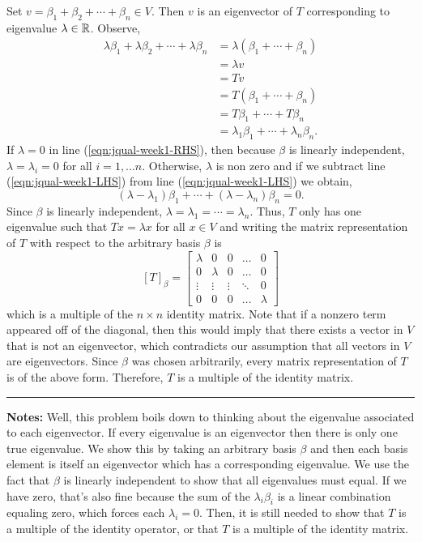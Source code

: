 \documentclass{article}
\begin{document}
Set $v = \beta_1 + \beta_2 + \cdots + \beta_n\in V$. Then $v$ is an eigenvector of $T$ corresponding to
 eigenvalue $\lambda\in\mathbb R$. Observe,
 	\begin{align}
		\lambda \beta_1 + \lambda \beta_2 + \cdots + \lambda \beta_n 
			& = \lambda(\beta_1+\cdots+\beta_n) \label{eqn:jqual-week1-RHS}\\
			& = \lambda v \nonumber \\
			& = Tv \nonumber \\
			& = T(\beta_1+\cdots+\beta_n) \nonumber \\
			& = T\beta_1 + \cdots + T\beta_n \nonumber \\
			& =  \lambda_1 \beta_1 + \cdots + \lambda_n \beta_n .\label{eqn:jqual-week1-LHS}
	\end{align}
If $\lambda = 0$ in line (\ref{eqn:jqual-week1-RHS}), then because $\beta$ is linearly independent, 
$\lambda = \lambda_i = 0$ for all $i = 1,\dots n$. Otherwise, $\lambda$ is non zero and if we subtract
 line  (\ref{eqn:jqual-week1-LHS}) from line (\ref{eqn:jqual-week1-LHS}) we obtain,
 	\[ (\lambda - \lambda_1) \beta_1 + \cdots + (\lambda - \lambda_n) \beta_n = 0.\]
Since $\beta$ is linearly independent, $\lambda = \lambda_1=\cdots = \lambda_n$. Thus, $T$ only has one eigenvalue such that $Tx = \lambda x$ for all $x\in V$ and writing the matrix representation of $T$ with respect to the arbitrary basis $\beta$ is 
	\[ [T]_\beta = \begin{bmatrix} 
				\lambda & 0 & 0 & \dots & 0\\
				0 & \lambda & 0 & \dots & 0\\
				\vdots & \vdots & \vdots & \ddots & 0\\
				0 & 0 & 0 & \dots & \lambda 
				\end{bmatrix}\]
which is a multiple of the $n\times n$ identity matrix. Note that if a nonzero term appeared off of the diagonal, then this would imply that there exists a vector in $V$ that is not an eigenvector, which contradicts our assumption that all vectors in $V$ are eigenvectors. Since $\beta$ was chosen arbitrarily, every matrix representation of $T$ is of the above form. Therefore, $T$ is a multiple of the identity matrix. \\

\hrule 

\textbf{Notes:} Well, this problem boils down to thinking about the eigenvalue associated to each eigenvector. If every eigenvalue is an eigenvector then there is only one true eigenvalue. We show this by taking an arbitrary basis $\beta$ and then each basis element is itself an eigenvector which has a corresponding eigenvalue. We use the fact that $\beta$ is linearly independent to show that all eigenvalues must equal. If we have zero, that's also fine because the sum of the $\lambda_i \beta_i$ is a linear combination equaling zero, which forces each $\lambda_i = 0$. Then, it is still needed to show that $T$ is a multiple of the identity operator, or that $T$ is a multiple of the identity matrix.\\
\end{document}
